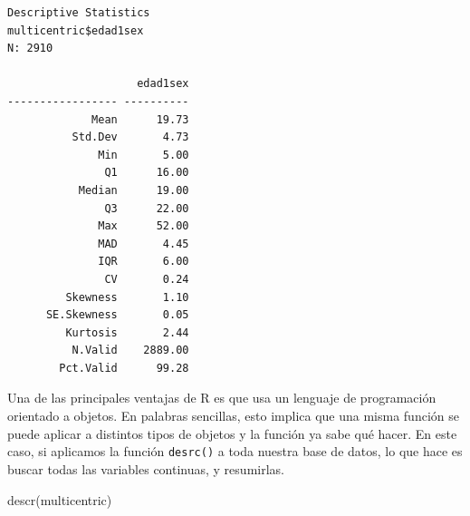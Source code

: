 \documentclass[
]{book}
\newenvironment{Shaded}{\begin{snugshade}}{\end{snugshade}}
\newcommand{\FunctionTok}[1]{\textcolor[rgb]{0.00,0.00,0.00}{#1}}
\newcommand{\NormalTok}[1]{#1}
\newcommand{\SpecialCharTok}[1]{\textcolor[rgb]{0.00,0.00,0.00}{#1}}
\begin{document}
\begin{Shaded}
\end{Shaded}

\begin{verbatim}
Descriptive Statistics  
multicentric$edad1sex  
N: 2910  

                    edad1sex
----------------- ----------
             Mean      19.73
          Std.Dev       4.73
              Min       5.00
               Q1      16.00
           Median      19.00
               Q3      22.00
              Max      52.00
              MAD       4.45
              IQR       6.00
               CV       0.24
         Skewness       1.10
      SE.Skewness       0.05
         Kurtosis       2.44
          N.Valid    2889.00
        Pct.Valid      99.28
\end{verbatim}

Una de las principales ventajas de R es que usa un lenguaje de programación orientado a objetos. En palabras sencillas, esto implica que una misma función se puede aplicar a distintos tipos de objetos y la función ya sabe qué hacer. En este caso, si aplicamos la función \texttt{desrc()} a toda nuestra base de datos, lo que hace es buscar todas las variables continuas, y resumirlas.

\begin{Shaded}
\begin{Highlighting}[]
\FunctionTok{descr}\NormalTok{(multicentric)}
\end{Highlighting}
\end{Shaded}
\end{document}
